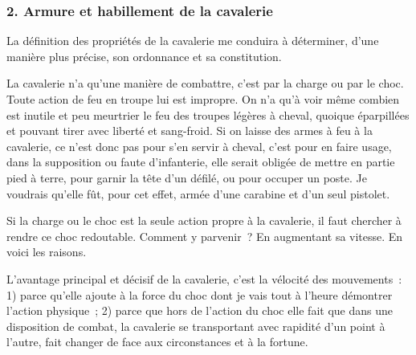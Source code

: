 \documentclass[french,twoside]{book} %
\begin{document}
\subsubsection[{2. Armure et habillement de la cavalerie}]{2. Armure et habillement de la cavalerie}
\noindent La définition des propriétés de la cavalerie me conduira à déterminer, d’une manière plus précise, son ordonnance et sa constitution.\par
La cavalerie n’a qu’une manière de combattre, c’est par la charge ou par le choc. Toute action de feu en troupe lui est impropre. On n’a qu’à voir même combien est inutile et peu meurtrier le feu des troupes légères à cheval, quoique éparpillées et pouvant tirer avec liberté et sang-froid. Si on laisse des armes à feu à la cavalerie, ce n’est donc pas pour s’en servir à cheval, c’est pour en faire usage, dans la supposition ou faute d’infanterie, elle serait obligée de mettre en partie pied à terre, pour garnir la tête d’un défilé, ou pour occuper un poste. Je voudrais qu’elle fût, pour cet effet, armée d’une carabine et d’un seul pistolet.\par
Si la charge ou le choc est la seule action propre à la cavalerie, il faut chercher à rendre ce choc redoutable. Comment y parvenir ? En augmentant sa vitesse. En voici les raisons.\par
L’avantage principal et décisif de la cavalerie, c’est la vélocité des mouvements : 1) parce qu’elle ajoute à la force du choc dont je vais tout à l’heure démontrer l’action physique ; 2) parce que hors de l’action du choc elle fait que dans une disposition de combat, la cavalerie se transportant avec rapidité d’un point à l’autre, fait changer de face aux circonstances et à la fortune.\par
\end{document}
